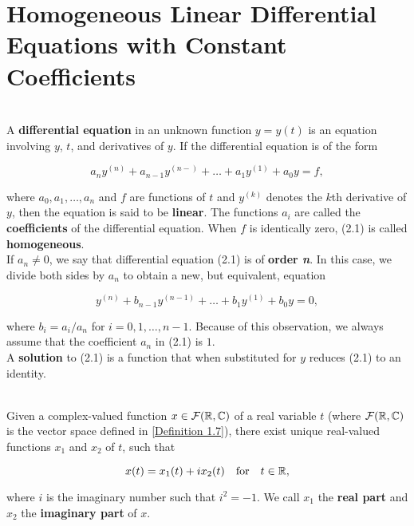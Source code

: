 \section{Homogeneous Linear Differential Equations with Constant Coefficients}

\begin{definition}
	\hfill\\
	A \textbf{differential equation} in an unknown function $y = y(t)$ is an equation involving $y$, $t$, and derivatives of $y$. If the differential equation is of the form

	\begin{equation}
		a_ny^{(n)}+a_{n-1}y^{(n-)} + \dots + a_1y^{(1)}+a_0y = f,
	\end{equation}

	where $a_0, a_1, \dots, a_n$ and $f$ are functions of $t$ and $y^{(k)}$ denotes the $k$th derivative of $y$, then the equation is said to be \textbf{linear}. The functions $a_i$ are called the \textbf{coefficients} of the differential equation. When $f$ is identically zero, (2.1) is called \textbf{homogeneous}.\\

	If $a_n \neq 0$, we say that differential equation (2.1) is of \textbf{order \textit{n}}. In this case, we divide both sides by $a_n$ to obtain a new, but equivalent, equation

	\[y^{(n)} + b_{n-1}y^{(n-1)} + \dots + b_1y^{(1)} + b_0y = 0,\]

	where $b_i = a_i/a_n$ for $i=0, 1, \dots, n-1$. Because of this observation, we always assume that the coefficient $a_n$ in (2.1) is $1$.\\

	A \textbf{solution} to (2.1) is a function that when substituted for $y$ reduces (2.1) to an identity.
\end{definition}

\begin{definition}
	\hfill\\
	Given a complex-valued function $x \in \mathcal{F}(\mathbb{R}, \mathbb{C})$ of a real variable $t$ (where $\mathcal{F}(\mathbb{R}, \mathbb{C})$ is the vector space defined in \autoref{Definition 1.7}), there exist unique real-valued functions $x_1$ and $x_2$ of $t$, such that

	\[x(t) = x_1(t) + ix_2(t)\ \ \ \text{for}\ \ \ t \in \R,\]

	where $i$ is the imaginary number such that $i^2 = -1$. We call $x_1$ the \textbf{real part} and $x_2$ the \textbf{imaginary part} of $x$.
\end{definition}

